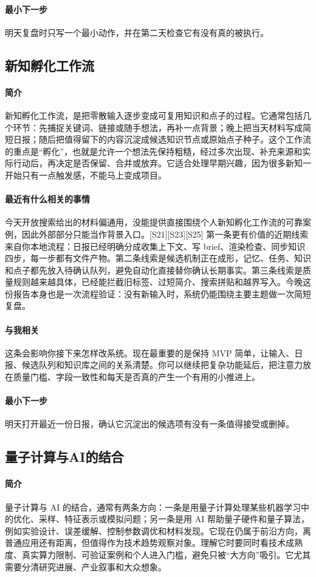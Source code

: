 \documentclass[UTF8,zihao=-4]{ctexart}
\begin{document}
\paragraph{最小下一步} 明天复盘时只写一个最小动作，并在第二天检查它有没有真的被执行。
\subsection*{新知孵化工作流}
\paragraph{简介} 新知孵化工作流，是把零散输入逐步变成可复用知识和点子的过程。它通常包括几个环节：先捕捉关键词、链接或随手想法，再补一点背景；晚上把当天材料写成简短日报；随后把值得留下的内容沉淀成候选知识节点或原始点子种子。这个工作流的重点是“孵化”，也就是允许一个想法先保持粗糙，经过多次出现、补充来源和实际行动后，再决定是否保留、合并或放弃。它适合处理早期兴趣，因为很多新知一开始只有一点触发感，不能马上变成项目。
\paragraph{最近有什么相关的事情} 今天开放搜索给出的材料偏通用，没能提供直接围绕个人新知孵化工作流的可靠案例，因此外部部分只能当作背景入口。[S21][S23][S25] 第一条更有价值的近期线索来自你本地流程：日报已经明确分成收集上下文、写 brief、渲染检查、同步知识四步，每一步都有文件产物。第二条线索是候选机制正在成形，记忆、任务、知识和点子都先放入待确认队列，避免自动化直接替你确认长期事实。第三条线索是质量规则越来越具体，已经能拦截旧标签、过短简介、搜索拼贴和越界写入。今晚这份报告本身也是一次流程验证：没有新输入时，系统仍能围绕主要主题做一次简短复盘。
\paragraph{与我相关} 这条会影响你接下来怎样改系统。现在最重要的是保持 MVP 简单，让输入、日报、候选队列和知识库之间的关系清楚。你可以继续把复杂功能延后，把注意力放在质量门槛、字段一致性和每天是否真的产生一个有用的小推进上。
\paragraph{最小下一步} 明天打开最近一份日报，确认它沉淀出的候选项有没有一条值得接受或删掉。
\subsection*{量子计算与AI的结合}
\paragraph{简介} 量子计算与 AI 的结合，通常有两条方向：一条是用量子计算处理某些机器学习中的优化、采样、特征表示或模拟问题；另一条是用 AI 帮助量子硬件和量子算法，例如实验设计、误差缓解、控制参数调优和材料发现。它现在仍属于前沿方向，离普通应用还有距离，但值得作为技术趋势观察对象。理解它时要同时看技术成熟度、真实算力限制、可验证案例和个人进入门槛，避免只被“大方向”吸引。它尤其需要分清研究进展、产业叙事和大众想象。
\end{document}
